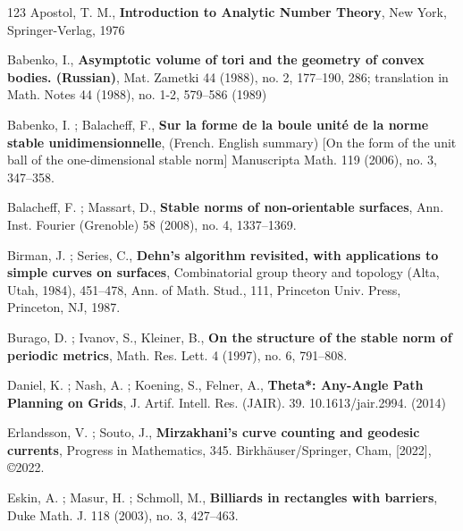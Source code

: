 \documentclass{article}
\theoremstyle{definition}
\begin{document}
 
 
 
 























\begin{thebibliography}{123}
      {\sc Apostol, T. M.}, {\bf Introduction to Analytic Number Theory}, New York, Springer-Verlag, 1976
    
     {\sc Babenko, I.}, {\bf Asymptotic volume of tori and the geometry of convex bodies. (Russian)},  Mat. Zametki 44 (1988), no. 2, 177–190, 286; translation in
Math. Notes 44 (1988), no. 1-2, 579–586 (1989) 

     {\sc Babenko, I. ; Balacheff, F.}, {\bf Sur la forme de la boule unité de la norme stable unidimensionnelle},  (French. English summary) [On the form of the unit ball of the one-dimensional stable norm]
Manuscripta Math. 119 (2006), no. 3, 347–358. 

	 {\sc Balacheff, F. ; Massart, D.}, {\bf Stable norms of non-orientable surfaces}, Ann. Inst. Fourier (Grenoble) 58 (2008), no. 4, 1337–1369.
	
	 {\sc Birman, J. ; Series, C.}, {\bf Dehn's algorithm revisited, with applications to simple curves on surfaces}, Combinatorial group theory and topology (Alta, Utah, 1984), 451–478,
	Ann. of Math. Stud., 111, Princeton Univ. Press, Princeton, NJ, 1987. 

     {\sc Burago, D. ; Ivanov, S., Kleiner, B.}, {\bf On the structure of the stable norm of periodic metrics},  Math. Res. Lett. 4 (1997), no. 6, 791–808.

     {\sc Daniel, K. ; Nash, A. ; Koening, S., Felner, A.}, {\bf Theta*: Any-Angle Path Planning on Grids}, J. Artif. Intell. Res. (JAIR). 39. 10.1613/jair.2994. (2014)
    
     {\sc Erlandsson, V. ; Souto, J.}, {\bf Mirzakhani's curve counting and geodesic currents}, Progress in Mathematics, 345. Birkhäuser/Springer, Cham, [2022], ©2022.

     {\sc Eskin, A. ; Masur, H. ; Schmoll, M.}, {\bf Billiards in rectangles with barriers},  Duke Math. J. 118 (2003), no. 3, 427–463. 
    

\end{thebibliography}
\end{document}

